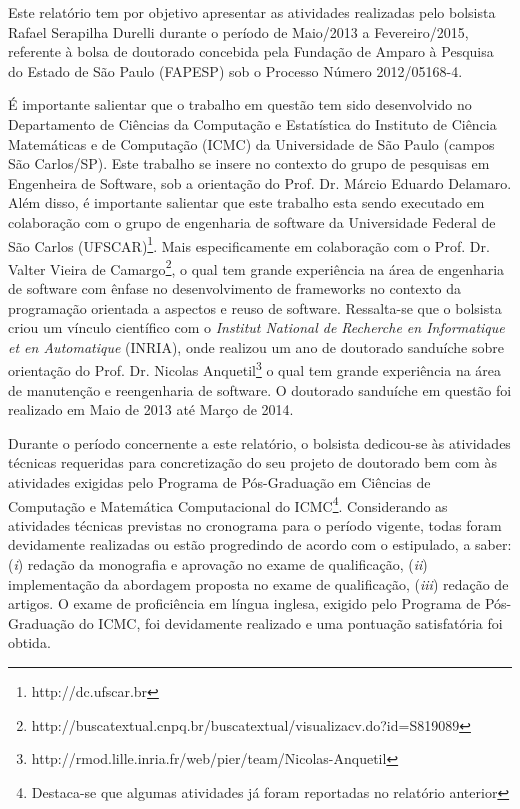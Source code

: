  Este relatório tem por objetivo apresentar as atividades realizadas pelo bolsista Rafael Serapilha Durelli durante o período de Maio/2013 a Fevereiro/2015,
 referente à bolsa de doutorado concebida pela Fundação de Amparo à Pesquisa do Estado de São Paulo (FAPESP) sob o Processo Número 2012/05168-4. 
 
 É importante salientar que o trabalho em questão tem sido desenvolvido no Departamento de Ciências da Computação e Estatística do Instituto de Ciência 
 Matemáticas e de Computação (ICMC) da Universidade de São Paulo (campos São Carlos/SP).  
 Este trabalho se insere no contexto do grupo de pesquisas em Engenheira de Software, sob a orientação do Prof. Dr. Márcio Eduardo Delamaro.
 Além disso, é importante salientar que este trabalho esta sendo executado em colaboração com o grupo de engenharia de software da Universidade Federal de São Carlos (UFSCAR)\footnote{http://dc.ufscar.br}.  
 Mais especificamente em colaboração com o Prof. Dr. Valter Vieira de Camargo\footnote{http://buscatextual.cnpq.br/buscatextual/visualizacv.do?id=S819089},
 o qual tem grande experiência na área de engenharia de software com ênfase no desenvolvimento de frameworks no contexto da programação orientada a aspectos e reuso de software.  Ressalta-se que o bolsista criou um vínculo científico com o \textit{Institut National de Recherche en Informatique et en Automatique} (INRIA),  
onde realizou um ano de doutorado sanduíche sobre orientação do  
 Prof. Dr. Nicolas Anquetil\footnote{http://rmod.lille.inria.fr/web/pier/team/Nicolas-Anquetil} o qual tem grande experiência na área de manutenção e reengenharia de software. O doutorado sanduíche em questão foi realizado em Maio de 2013 até Março de 2014.

Durante o período concernente a este relatório, o bolsista dedicou-se às atividades técnicas requeridas para concretização do seu projeto de doutorado bem com às atividades exigidas pelo Programa de Pós-Graduação em Ciências de Computação e Matemática Computacional do ICMC\footnote{Destaca-se que algumas atividades já foram reportadas no relatório anterior}. Considerando as atividades técnicas previstas no cronograma para o período vigente, todas foram devidamente realizadas ou estão progredindo de acordo com o estipulado, a saber: (\textit{i}) redação da monografia e aprovação no exame de qualificação, (\textit{ii}) implementação da abordagem proposta no exame de qualificação, (\textit{iii}) redação de artigos. O exame de proficiência em língua inglesa, exigido pelo Programa de Pós-Graduação do ICMC, foi devidamente realizado e uma pontuação satisfatória foi obtida.

